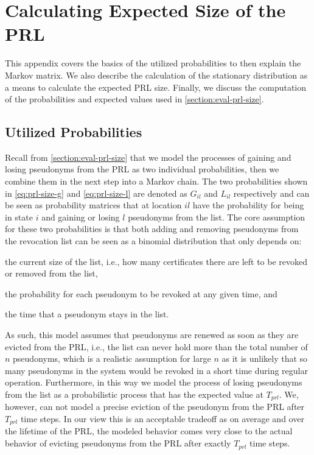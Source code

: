 \section{Calculating Expected Size of the PRL}
\label{appendix:markov}

This appendix covers the basics of the utilized probabilities to then explain
the Markov matrix. We also describe the calculation of the stationary
distribution as a means to calculate the expected \ac{PRL} size. Finally, we
discuss the computation of the probabilities and expected values used in
\cref{section:eval-prl-size}.

\subsection{Utilized Probabilities}

Recall from \cref{section:eval-prl-size} that we model the processes of gaining
and losing pseudonyms from the \ac{PRL} as two individual probabilities, then we
combine them in the next step into a Markov chain. The two probabilities shown
in \cref{eq:prl-size-g} and \cref{eq:prl-size-l} are denoted as $G_{il}$ and
$L_{il}$ respectively and can be seen as probability matrices that at location
$il$ have the probability for being in state $i$ and gaining or losing $l$
pseudonyms from the list. The core assumption for these two probabilities is
that both adding and removing pseudonyms from the revocation list can be seen as
a binomial distribution that only depends on:
\begin{paraenum}
    \item the current size of the list, i.e., how many certificates there are left to be revoked or removed from the list,
    \item the probability for each pseudonym to be revoked at any given time, and
    \item the time that a pseudonym stays in the list.
\end{paraenum}
As such, this model assumes that pseudonyms are renewed as soon as they are
evicted from the \ac{PRL}, i.e., the list can never hold more than the total
number of $n$ pseudonyms, which is a realistic assumption for large $n$ as it is
unlikely that so many pseudonyms in the system would be revoked in a short time
during regular operation.  Furthermore, in this way we model the process of
losing pseudonyms from the list as a probabilistic process that has the expected
value at $T_{prl}$.  We, however, can not model a precise eviction of the
pseudonym from the \ac{PRL} after $T_{prl}$ time steps.  In our view this is an
acceptable tradeoff as on average and over the lifetime of the \ac{PRL}, the
modeled behavior comes very close to the actual behavior of evicting pseudonyms
from the \ac{PRL} after exactly $T_{prl}$ time steps.

